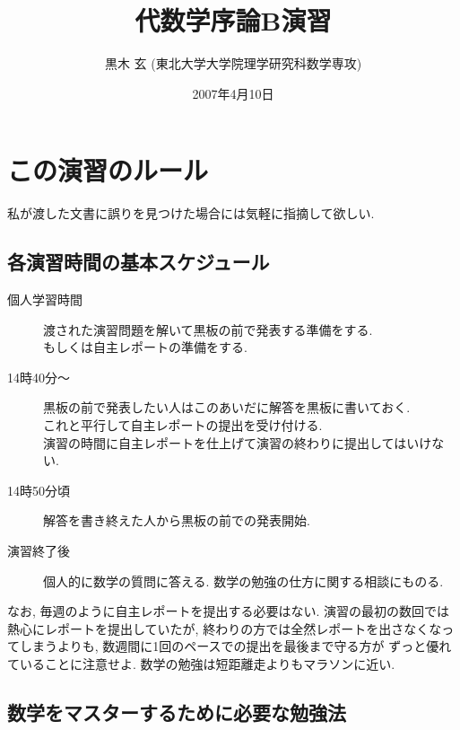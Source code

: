 \documentclass[12pt,twoside]{jarticle}
\begin{document}

\title{\bf 代数学序論B演習}
\author{黒木 玄 \quad (東北大学大学院理学研究科数学専攻)}
\date{2007年4月10日}

\maketitle

\tableofcontents


\section{この演習のルール}

私が渡した文書に誤りを見つけた場合には気軽に指摘して欲しい.

\subsection{各演習時間の基本スケジュール}

\begin{description}
 \item[個人学習時間]
  渡された演習問題を解いて黒板の前で発表する準備をする. \\
  もしくは自主レポートの準備をする.
 \item[14時40分〜] 
  黒板の前で発表したい人はこのあいだに解答を黒板に書いておく. \\
  これと平行して自主レポートの提出を受け付ける. \\
  演習の時間に自主レポートを仕上げて演習の終わりに提出してはいけない. 
 \item[14時50分頃]
  解答を書き終えた人から黒板の前での発表開始.
 \item[演習終了後]
  個人的に数学の質問に答える. 
  数学の勉強の仕方に関する相談にものる.
\end{description}

なお, 毎週のように自主レポートを提出する必要はない. 
演習の最初の数回では熱心にレポートを提出していたが, 
終わりの方では全然レポートを出さなくなってしまうよりも, 
数週間に1回のペースでの提出を最後まで守る方が
ずっと優れていることに注意せよ.
数学の勉強は短距離走よりもマラソンに近い.

\subsection{数学をマスターするために必要な勉強法}
\end{document}

